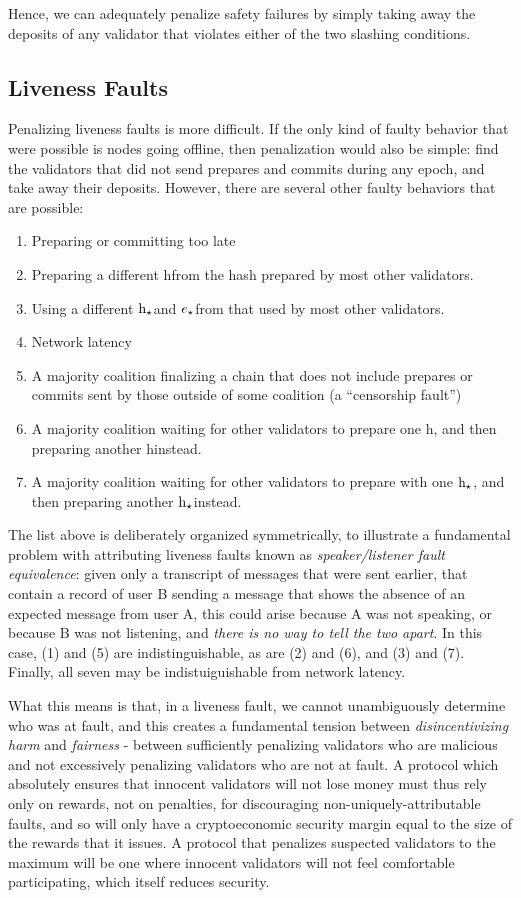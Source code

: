 \documentclass[12pt, final]{article}
\newcommand{\epoch}{\ensuremath{e}\space}
\newcommand{\hash}{\textnormal{h}\space}
\newcommand{\epochsource}{\ensuremath{\epoch_{\star}}\space}
\newcommand{\hashsource}{\ensuremath{\hash_{\star}}\space}
\begin{document}
Hence, we can adequately penalize safety failures by simply taking away the deposits of any validator that violates either of the two slashing conditions.

\subsection{Liveness Faults}

Penalizing liveness faults is more difficult. If the only kind of faulty behavior that were possible is nodes going offline, then penalization would also be simple: find the validators that did not send prepares and commits during any epoch, and take away their deposits. However, there are several other faulty behaviors that are possible:

\begin{enumerate}
\item Preparing or committing too late
\item Preparing a different \hash from the hash prepared by most other validators.
\item Using a different \hashsource and \epochsource from that used by most other validators.
\item Network latency
\item A majority coalition finalizing a chain that does not include prepares or commits sent by those outside of some coalition (a ``censorship fault'')
\item A majority coalition waiting for other validators to prepare one \hash, and then preparing another \hash instead.
\item A majority coalition waiting for other validators to prepare with one \hashsource, and then preparing another \hashsource instead.
\end{enumerate}

The list above is deliberately organized symmetrically, to illustrate a fundamental problem with attributing liveness faults known as \textit{speaker/listener fault equivalence}: given only a transcript of messages that were sent earlier, that contain a record of user B sending a message that shows the absence of an expected message from user A, this could arise because A was not speaking, or because B was not listening, and \textit{there is no way to tell the two apart}. In this case, (1) and (5) are indistinguishable, as are (2) and (6), and (3) and (7). Finally, all seven may be indistuiguishable from network latency.

What this means is that, in a liveness fault, we cannot unambiguously determine who was at fault, and this creates a fundamental tension between \textit{disincentivizing harm} and \textit{fairness} - between sufficiently penalizing validators who are malicious and not excessively penalizing validators who are not at fault. A protocol which absolutely ensures that innocent validators will not lose money must thus rely only on rewards, not on penalties, for discouraging non-uniquely-attributable faults, and so will only have a cryptoeconomic security margin equal to the size of the rewards that it issues. A protocol that penalizes suspected validators to the maximum will be one where innocent validators will not feel comfortable participating, which itself reduces security.
\end{document}
